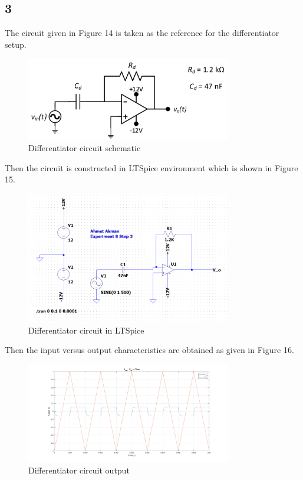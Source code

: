 \documentclass[letterpaper,12pt]{article}
\begin{document}
\subsection{3}
The circuit given in Figure 14 is taken as the reference for the differentiator setup.
\begin{figure}[H]
	\centering
   \includegraphics[width=0.8\textwidth]{differentiator.png}
   \caption{Differentiator circuit schematic}
\end{figure} 
Then the circuit is constructed in LTSpice environment which is shown in Figure 15.
\begin{figure}[H]
	\centering
   \includegraphics[width=0.8\textwidth]{differentiator_sim.png}
   \caption{Differentiator circuit in LTSpice}
\end{figure} 
Then the input versus output characteristics are obtained as given in Figure 16.
\begin{figure}[H]
	\centering
   \includegraphics[width=0.8\textwidth]{differentiator_1.png}
   \caption{Differentiator circuit output}
\end{figure} 
\end{document}
